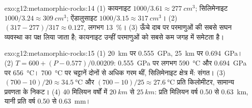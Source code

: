 \begin{solution}{exo:g12:metamorphic-rocks:14}
(1) कायनाइट $1000/3.61 \approx \qty{277}{cm^3}$; सिलिमेनाइट $1000/3.24
\approx \qty{309}{cm^3}$; ऐंडालुसाइट $1000/3.15 \approx \qty{317}{cm^3}$।
(2) $(317 - 277)/317 \approx 0.127$, लगभग \qty{13}{\percent}। (3) ऊँचे
दाब पर परमाणुओं की सबसे सघन व्यवस्था का पक्ष लिया जाता है; कायनाइट
उन्हीं परमाणुओं को सबसे कम जगह में समेटता है।
\end{solution}

\begin{solution}{exo:g12:metamorphic-rocks:15}
(1) \qty{20}{km} पर \qty{0.555}{GPa}, \qty{25}{km} पर \qty{0.694}{GPa}।
(2) $T = 600 + (P - 0.577)/0.00209$: \qty{0.555}{GPa} पर लगभग
\qty{590}{\celsius} और \qty{0.694}{GPa} पर \qty{656}{\celsius}।
\qty{700}{\celsius} पर चट्टानें दोनों से अधिक गरम थीं, सिलिमेनाइट
क्षेत्र में: संगत। (3) $(700 - 10)/20 \approx \qty{34.5}{\celsius}$ और
$(700 - 10)/25 \approx \qty{27.6}{\celsius}$ प्रति किलोमीटर, सामान्य
प्रवणता के निकट। (4) 40 मिलियन वर्षों में $\qty{20}{km}$ से $\qty{25}{km}$:
प्रति मिलियन वर्ष 0.50 से \qty{0.63}{km}, यानी प्रति वर्ष 0.50 से \qty{0.63}{mm}।
\end{solution}

